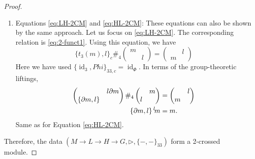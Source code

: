 \documentclass[11pt, reqno]{amsart} %
\newcommand{\act}[1]{\,\sp{#1}\!}
\newcommand{\id}{{\mathop{\mathrm{id}}}}
\theoremstyle{definition}
\theoremstyle{remark}
\numberwithin{equation}{section}
\begin{document}
\begin{proof}
\begin{enumerate}
  \item Equations \eqref{eq:LH-2CM} and \eqref{eq:HL-2CM}: 
  These equations can also be shown by the same approach. Let us focus on \eqref{eq:LH-2CM}. The corresponding relation is \eqref{eq:2-funct1}. Using this equation, we have
  \[
    \{t_3(m),l\}_c\#_4\begin{pmatrix}m & \\ & l\end{pmatrix} = \begin{pmatrix}&l \\ m&\end{pmatrix}
  \]
  Here we have used $\{\id_3,Phi\}_{33,c} = \id_{\Phi}$. 
  In terms of the group-theoretic liftings,
  \begin{align*}
    \begin{pmatrix} &l\partial m \\ \{\partial m,l\} & \end{pmatrix}\#_4\begin{pmatrix} & m\\l & \end{pmatrix} &= \begin{pmatrix}&l \\ m&\end{pmatrix} \\
    \{\partial m,l\}\act{l}m &= m.
  \end{align*}
  Same as for Equation \eqref{eq:HL-2CM}.
\end{enumerate}
Therefore, the data $(M\to L\to H\to G,\triangleright,\{-,-\}_{33})$ form a 2-crossed module. 


\end{proof}
\end{document}
